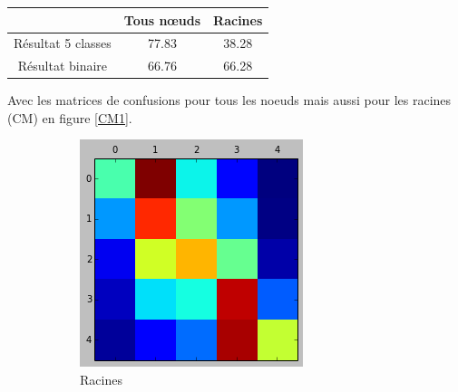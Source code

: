 \documentclass[conference]{IEEEtran}
\begin{document}
\begin{center}
\begin{tabular}{|c|c|c|}
\hline
& Tous nœuds & Racines\\ \hline
Résultat 5 classes & 77.83 & 38.28  \\ \hline
Résultat binaire & 66.76 & 66.28 \\ \hline
\end{tabular}
\end{center}

Avec les matrices de confusions pour tous les noeuds mais aussi pour les racines (CM) en figure \ref{CM1}.

\begin{figure}[h]
\begin{subfigure}{0.48\columnwidth}
\includegraphics[width=\textwidth]{fig/CMLastTrainRoot.png}
\caption{Racines}
\end{subfigure}
\begin{subfigure}{0.48\columnwidth}

\end{subfigure}
\end{figure}
\end{document}
